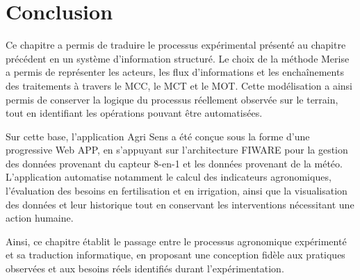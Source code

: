 \section{Conclusion}
Ce chapitre a permis de traduire le processus expérimental présenté au chapitre précédent en un système d’information structuré. Le choix de la méthode Merise a permis de représenter les acteurs, les flux d'informations et les enchaînements des traitements à travers le MCC, le MCT et le MOT. Cette modélisation a ainsi permis de conserver la logique du processus réellement observée sur le terrain, tout en identifiant les opérations pouvant être automatisées.

Sur cette base, l’application Agri Sens a été conçue sous la forme d’une progressive Web APP, en s’appuyant sur l’architecture FIWARE pour la gestion des données provenant du capteur 8-en-1 et les données provenant de la météo. L’application automatise notamment le calcul des indicateurs agronomiques, l'évaluation des besoins en fertilisation et en irrigation, ainsi que la visualisation des données et leur historique tout en conservant les interventions nécessitant une action humaine.

Ainsi, ce chapitre établit le passage entre le processus agronomique expérimenté et sa traduction informatique, en proposant une conception fidèle aux pratiques observées et aux besoins réels identifiés durant l'expérimentation.
